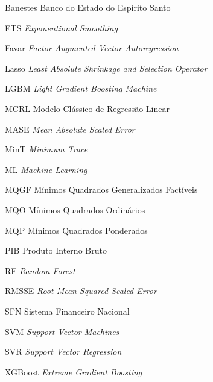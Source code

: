 \begin{siglas}
  \item[Banestes] Banco do Estado do Espírito Santo
  \item[ETS] \textit{Exponentional Smoothing}
  \item[Favar] \textit{Factor Augmented Vector Autoregression}
  \item[Lasso] \textit{Least Absolute Shrinkage and Selection Operator}
  \item[LGBM] \textit{Light Gradient Boosting Machine}
  \item[MCRL] Modelo Clássico de Regressão Linear
  \item[MASE] \textit{Mean Absolute Scaled Error}
  \item[MinT] \textit{Minimum Trace}
  \item[ML] \textit{Machine Learning}
  \item[MQGF] Mínimos Quadrados Generalizados Factíveis
  \item[MQO] Mínimos Quadrados Ordinários
  \item[MQP] Mínimos Quadrados Ponderados
  \item[PIB] Produto Interno Bruto
  \item[RF] \textit{Random Forest}
  \item[RMSSE] \textit{Root Mean Squared Scaled Error}
  \item[SFN] Sistema Financeiro Nacional
  \item[SVM] \textit{Support Vector Machines}
  \item[SVR] \textit{Support Vector Regression}
  \item[XGBoost] \textit{Extreme Gradient Boosting}
\end{siglas}

